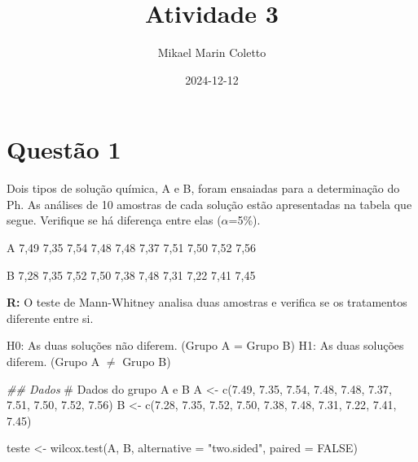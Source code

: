 \documentclass[
  letterpaper,
  DIV=11,
  numbers=noendperiod]{scrartcl}
\title{Atividade 3}
\author{Mikael Marin Coletto}
\date{2024-12-12}
\newenvironment{Shaded}{\begin{snugshade}}{\end{snugshade}}
\newcommand{\AttributeTok}[1]{\textcolor[rgb]{0.40,0.45,0.13}{#1}}
\newcommand{\CommentTok}[1]{\textcolor[rgb]{0.37,0.37,0.37}{#1}}
\newcommand{\ConstantTok}[1]{\textcolor[rgb]{0.56,0.35,0.01}{#1}}
\newcommand{\DocumentationTok}[1]{\textcolor[rgb]{0.37,0.37,0.37}{\textit{#1}}}
\newcommand{\FloatTok}[1]{\textcolor[rgb]{0.68,0.00,0.00}{#1}}
\newcommand{\FunctionTok}[1]{\textcolor[rgb]{0.28,0.35,0.67}{#1}}
\newcommand{\NormalTok}[1]{\textcolor[rgb]{0.00,0.23,0.31}{#1}}
\newcommand{\OtherTok}[1]{\textcolor[rgb]{0.00,0.23,0.31}{#1}}
\newcommand{\StringTok}[1]{\textcolor[rgb]{0.13,0.47,0.30}{#1}}
\renewcommand*\contentsname{Índice}
\newcommand\contentsname{Índice}
\begin{document}
\maketitle

\renewcommand*\contentsname{Índice}
{
\hypersetup{linkcolor=}
\setcounter{tocdepth}{3}
\tableofcontents
}

\section{Questão 1}\label{questuxe3o-1}

Dois tipos de solução química, A e B, foram ensaiadas para a
determinação do Ph. As análises de 10 amostras de cada solução estão
apresentadas na tabela que segue. Verifique se há diferença entre elas
(\(\alpha\)=5\%).

A 7,49 7,35 7,54 7,48 7,48 7,37 7,51 7,50 7,52 7,56

B 7,28 7,35 7,52 7,50 7,38 7,48 7,31 7,22 7,41 7,45

\textbf{R:} O teste de Mann-Whitney analisa duas amostras e verifica se
os tratamentos diferente entre si.

H0: As duas soluções não diferem. (Grupo A = Grupo B) H1: As duas
soluções diferem. (Grupo A \(\neq\) Grupo B)

\begin{Shaded}
\begin{Highlighting}[]
\DocumentationTok{\#\# Dados}
\CommentTok{\# Dados do grupo A e B}
\NormalTok{A }\OtherTok{\textless{}{-}} \FunctionTok{c}\NormalTok{(}\FloatTok{7.49}\NormalTok{, }\FloatTok{7.35}\NormalTok{, }\FloatTok{7.54}\NormalTok{, }\FloatTok{7.48}\NormalTok{, }\FloatTok{7.48}\NormalTok{, }\FloatTok{7.37}\NormalTok{, }\FloatTok{7.51}\NormalTok{, }\FloatTok{7.50}\NormalTok{, }\FloatTok{7.52}\NormalTok{, }\FloatTok{7.56}\NormalTok{)}
\NormalTok{B }\OtherTok{\textless{}{-}} \FunctionTok{c}\NormalTok{(}\FloatTok{7.28}\NormalTok{, }\FloatTok{7.35}\NormalTok{, }\FloatTok{7.52}\NormalTok{, }\FloatTok{7.50}\NormalTok{, }\FloatTok{7.38}\NormalTok{, }\FloatTok{7.48}\NormalTok{, }\FloatTok{7.31}\NormalTok{, }\FloatTok{7.22}\NormalTok{, }\FloatTok{7.41}\NormalTok{, }\FloatTok{7.45}\NormalTok{)}

\NormalTok{teste }\OtherTok{\textless{}{-}} \FunctionTok{wilcox.test}\NormalTok{(A, B, }\AttributeTok{alternative =} \StringTok{"two.sided"}\NormalTok{, }\AttributeTok{paired =} \ConstantTok{FALSE}\NormalTok{)}
\end{Highlighting}
\end{Shaded}
\end{document}
